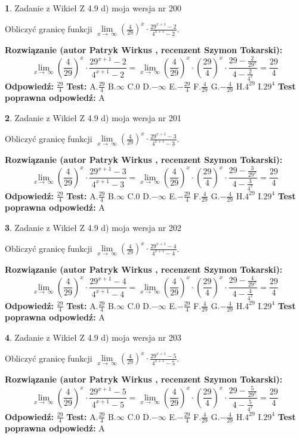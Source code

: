 \documentclass[12pt, a4paper]{article}
\theoremstyle{definition} %
\newtheorem{zad}{}
\newcommand{\zadStart}[1]{\begin{zad}#1\newline}
\newcommand{\zadStop}{\end{zad}}
\newcommand{\rozwStart}[2]{\noindent \textbf{Rozwiązanie (autor #1 , recenzent #2): }\newline}
\newcommand{\rozwStop}{\newline}
\newcommand{\odpStart}{\noindent \textbf{Odpowiedź:}\newline}
\newcommand{\odpStop}{\newline}
\newcommand{\testStart}{\noindent \textbf{Test:}\newline}
\newcommand{\testStop}{\newline}
\newcommand{\kluczStart}{\noindent \textbf{Test poprawna odpowiedź:}\newline}
\newcommand{\kluczStop}{\newline}
\begin{document}
\zadStart{Zadanie z Wikieł Z 4.9 d) moja wersja nr 200}


Obliczyć granicę funkcji  $\lim\limits_{x\to\ \infty}(\frac{4}{29})^{x}\cdot\frac{29^{x+1}-2}{4^{x+1}-2}$.
\zadStop
\rozwStart{Patryk Wirkus}{Szymon Tokarski}
$$\lim\limits_{x\to\ \infty}(\frac{4}{29})^{x}\cdot\frac{29^{x+1}-2}{4^{x+1}-2}=\lim\limits_{x\to\ \infty}(\frac{4}{29})^{x}\cdot(\frac{29}{4})^{x} \cdot \frac{29-\frac{2}{29^{x}}}{4-\frac{2}{4^{x}}} = \frac{29}{4}$$
\rozwStop
\odpStart
$\frac{29}{4}$
\odpStop
\testStart
A.$\frac{29}{4}$ B.$\infty$ C.$0$ D.$-\infty$ E.$-\frac{29}{4}$
F.$\frac{4}{29}$ G.$-\frac{4}{29}$
H.$4^{29}$
I.$29^{4}$
\testStop
\kluczStart
A
\kluczStop



\zadStart{Zadanie z Wikieł Z 4.9 d) moja wersja nr 201}


Obliczyć granicę funkcji  $\lim\limits_{x\to\ \infty}(\frac{4}{29})^{x}\cdot\frac{29^{x+1}-3}{4^{x+1}-3}$.
\zadStop
\rozwStart{Patryk Wirkus}{Szymon Tokarski}
$$\lim\limits_{x\to\ \infty}(\frac{4}{29})^{x}\cdot\frac{29^{x+1}-3}{4^{x+1}-3}=\lim\limits_{x\to\ \infty}(\frac{4}{29})^{x}\cdot(\frac{29}{4})^{x} \cdot \frac{29-\frac{3}{29^{x}}}{4-\frac{3}{4^{x}}} = \frac{29}{4}$$
\rozwStop
\odpStart
$\frac{29}{4}$
\odpStop
\testStart
A.$\frac{29}{4}$ B.$\infty$ C.$0$ D.$-\infty$ E.$-\frac{29}{4}$
F.$\frac{4}{29}$ G.$-\frac{4}{29}$
H.$4^{29}$
I.$29^{4}$
\testStop
\kluczStart
A
\kluczStop



\zadStart{Zadanie z Wikieł Z 4.9 d) moja wersja nr 202}


Obliczyć granicę funkcji  $\lim\limits_{x\to\ \infty}(\frac{4}{29})^{x}\cdot\frac{29^{x+1}-4}{4^{x+1}-4}$.
\zadStop
\rozwStart{Patryk Wirkus}{Szymon Tokarski}
$$\lim\limits_{x\to\ \infty}(\frac{4}{29})^{x}\cdot\frac{29^{x+1}-4}{4^{x+1}-4}=\lim\limits_{x\to\ \infty}(\frac{4}{29})^{x}\cdot(\frac{29}{4})^{x} \cdot \frac{29-\frac{4}{29^{x}}}{4-\frac{4}{4^{x}}} = \frac{29}{4}$$
\rozwStop
\odpStart
$\frac{29}{4}$
\odpStop
\testStart
A.$\frac{29}{4}$ B.$\infty$ C.$0$ D.$-\infty$ E.$-\frac{29}{4}$
F.$\frac{4}{29}$ G.$-\frac{4}{29}$
H.$4^{29}$
I.$29^{4}$
\testStop
\kluczStart
A
\kluczStop



\zadStart{Zadanie z Wikieł Z 4.9 d) moja wersja nr 203}


Obliczyć granicę funkcji  $\lim\limits_{x\to\ \infty}(\frac{4}{29})^{x}\cdot\frac{29^{x+1}-5}{4^{x+1}-5}$.
\zadStop
\rozwStart{Patryk Wirkus}{Szymon Tokarski}
$$\lim\limits_{x\to\ \infty}(\frac{4}{29})^{x}\cdot\frac{29^{x+1}-5}{4^{x+1}-5}=\lim\limits_{x\to\ \infty}(\frac{4}{29})^{x}\cdot(\frac{29}{4})^{x} \cdot \frac{29-\frac{5}{29^{x}}}{4-\frac{5}{4^{x}}} = \frac{29}{4}$$
\rozwStop
\odpStart
$\frac{29}{4}$
\odpStop
\testStart
A.$\frac{29}{4}$ B.$\infty$ C.$0$ D.$-\infty$ E.$-\frac{29}{4}$
F.$\frac{4}{29}$ G.$-\frac{4}{29}$
H.$4^{29}$
I.$29^{4}$
\testStop
\kluczStart
A
\kluczStop
\end{document}

